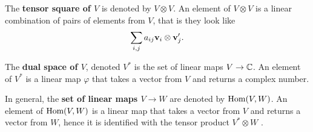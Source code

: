 \begin{example}
	The \textbf{tensor square of $V$} is denoted by $V \otimes V$. An element of $V \otimes V$ is a linear combination of pairs of elements from $V$, that is they look like
	\begin{align*}
		\sum_{i,j} a_{ij} \mathbf{v}_i \otimes \mathbf{v}'_j.
	\end{align*}
%	
%	
\end{example}

The \textbf{dual space of $V$}, denoted $V^*$ is the set of linear maps $V \rightarrow \mathbb{C}$. An element of $V^*$ is a linear map $\varphi$ that takes a vector from $V$ and returns a complex number.

In general, the \textbf{set of linear maps $V \rightarrow W$} are denoted by $\text{Hom}(V,W)$. An element of $\text{Hom}(V,W)$ is a linear map that takes a vector from $V$ and returns a vector from $W$, hence it is identified with the tensor product $V^* \otimes W$ \cite[Sect.1.1.]{FultonHarris}.

